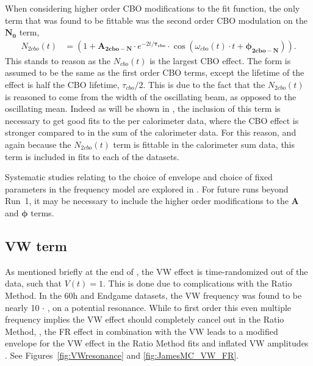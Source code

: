 When considering higher order CBO modifications to the fit function, the only term that was found to be fittable was the second order CBO modulation on the $\boldsymbol{N_{0}}$ term, 
    \begin{align}
        N_{2cbo}(t) &= (1 + \boldsymbol{A_{2cbo-N}} \cdot e^{-2t/\boldsymbol{\tau_{cbo}}} \cdot \cos(\omega_{cbo}(t) \cdot t + \boldsymbol{\phi_{2cbo-N}})). \label{eq:N2cbo}
    \end{align}
This stands to reason as the $N_{cbo}(t)$ is the largest CBO effect. The form is assumed to be the same as the first order CBO terms, except the lifetime of the effect is half the CBO lifetime, $\tau_{cbo}/2$. This is due to the fact that the $N_{2cbo}(t)$ is reasoned to come from the width of the oscillating beam, as opposed to the oscillating mean. Indeed as will be shown in , the inclusion of this term is necessary to get good fits to the per calorimeter data, where the CBO effect is stronger compared to in the sum of the calorimeter data. For this reason, and again because the $N_{2cbo}(t)$ term is fittable in the calorimeter sum data, this term is included in fits to each of the datasets.


Systematic studies relating to the choice of envelope and choice of fixed parameters in the frequency model are explored in . For future runs beyond Run~1, it may be necessary to include the higher order modifications to the $\boldsymbol{A}$ and $\boldsymbol{\phi}$ terms.



\subsection{VW term}
\label{sub:vw_term}

As mentioned briefly at the end of , the VW effect is time-randomized out of the data, such that $V(t) = 1$. This is done due to complications with the Ratio Method. In the 60h and Endgame datasets, the VW frequency was found to be nearly 10 $\cdot$ \wa, on a potential resonance. While to first order this even multiple frequency implies the VW effect should completely cancel out in the Ratio Method, , the FR effect in combination with the VW leads to a modified envelope for the VW effect in the Ratio Method fits and inflated VW amplitudes \cite{VWinRatio}. See Figures~\ref{fig:VWresonance} and \ref{fig:JamesMC_VW_FR}.

